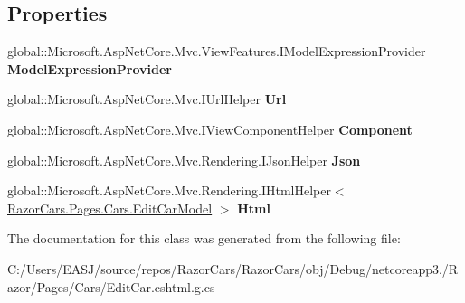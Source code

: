 \subsection*{Properties}
\begin{DoxyCompactItemize}
\item 
\mbox{\label{class_razor_cars_1_1_pages_1_1_cars_1_1_pages___cars___edit_car_a4ce048cdc08141244add3a857784702a}} 
global\+::\+Microsoft.\+Asp\+Net\+Core.\+Mvc.\+View\+Features.\+I\+Model\+Expression\+Provider {\bfseries Model\+Expression\+Provider}
\item 
\mbox{\label{class_razor_cars_1_1_pages_1_1_cars_1_1_pages___cars___edit_car_af04f72204407faaf80a6e95626ee8251}} 
global\+::\+Microsoft.\+Asp\+Net\+Core.\+Mvc.\+I\+Url\+Helper {\bfseries Url}
\item 
\mbox{\label{class_razor_cars_1_1_pages_1_1_cars_1_1_pages___cars___edit_car_af4b42519ffbb33a7b690182cce43b569}} 
global\+::\+Microsoft.\+Asp\+Net\+Core.\+Mvc.\+I\+View\+Component\+Helper {\bfseries Component}
\item 
\mbox{\label{class_razor_cars_1_1_pages_1_1_cars_1_1_pages___cars___edit_car_a9e2984968378af64dcc687510cde99b9}} 
global\+::\+Microsoft.\+Asp\+Net\+Core.\+Mvc.\+Rendering.\+I\+Json\+Helper {\bfseries Json}
\item 
\mbox{\label{class_razor_cars_1_1_pages_1_1_cars_1_1_pages___cars___edit_car_a517cf818b4a1c02dcc0921741318b7e7}} 
global\+::\+Microsoft.\+Asp\+Net\+Core.\+Mvc.\+Rendering.\+I\+Html\+Helper$<$ \mbox{\hyperlink{class_razor_cars_1_1_pages_1_1_cars_1_1_edit_car_model}{Razor\+Cars.\+Pages.\+Cars.\+Edit\+Car\+Model}} $>$ {\bfseries Html}
\end{DoxyCompactItemize}


The documentation for this class was generated from the following file\+:\begin{DoxyCompactItemize}
\item 
C\+:/\+Users/\+E\+A\+S\+J/source/repos/\+Razor\+Cars/\+Razor\+Cars/obj/\+Debug/netcoreapp3./\+Razor/\+Pages/\+Cars/Edit\+Car.\+cshtml.\+g.\+cs\end{DoxyCompactItemize}
